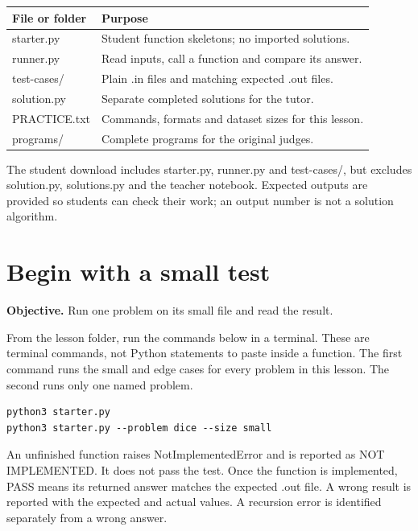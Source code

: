 \documentclass[11pt,a4paper,oneside]{report}
\newcommand{\sectiongoal}[1]{\par{\color{quiet}\textbf{Objective.} #1}\par\smallskip}
\newcommand{\nextpointer}[1]{\par\smallskip{\color{quiet}\textbf{Next.} #1}\par}
\begin{document}
\par\medskip\begingroup\small\setlength{\tabcolsep}{4pt}\renewcommand{\arraystretch}{1.3}\begin{tabularx}{\linewidth}{>{\raggedright\arraybackslash}p{30mm}>{\raggedright\arraybackslash}X}\toprule\textbf{File or folder} & \textbf{Purpose}\\\midrule
{}starter.py & Student function skeletons; no imported solutions.\\
{}runner.py & Read inputs, call a function and compare its answer.\\
{}test-cases/ & Plain .in files and matching expected .out files.\\
{}solution.py & Separate completed solutions for the tutor.\\
{}PRACTICE.txt & Commands, formats and dataset sizes for this lesson.\\
{}programs/ & Complete programs for the original judges.\\
\bottomrule\end{tabularx}\endgroup\par\medskip
The student download includes starter.py, runner.py and test-cases/, but excludes solution.py, solutions.py and the teacher notebook. Expected outputs are provided so students can check their work; an output number is not a solution algorithm.

\nextpointer{Run the small tests first.}
\section{Begin with a small test}
\sectiongoal{Run one problem on its small file and read the result.}
From the lesson folder, run the commands below in a terminal. These are terminal commands, not Python statements to paste inside a function. The first command runs the small and edge cases for every problem in this lesson. The second runs only one named problem.

\begin{lstlisting}[language={}]
python3 starter.py
python3 starter.py --problem dice --size small
\end{lstlisting}
An unfinished function raises NotImplementedError and is reported as NOT IMPLEMENTED. It does not pass the test. Once the function is implemented, PASS means its returned answer matches the expected .out file. A wrong result is reported with the expected and actual values. A recursion error is identified separately from a wrong answer.
\end{document}
